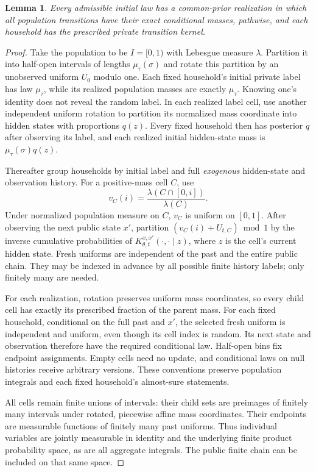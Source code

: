 \documentclass[11pt]{article}
\newtheorem{lemma}{Lemma}
\begin{document}
\begin{lemma}\label{population}
Every admissible initial law has a common-prior realization in which all population transitions have their exact conditional masses, pathwise, and each household has the prescribed private transition kernel.
\end{lemma}
\begin{proof}
Take the population to be $I=[0,1)$ with Lebesgue measure $\lambda$. Partition it into half-open intervals of lengths $\mu_\tau(\sigma)$ and rotate this partition by an unobserved uniform $U_0$ modulo one. Each fixed household's initial private label has law $\mu_\tau$, while its realized population masses are exactly $\mu_\tau$. Knowing one's identity does not reveal the random label. In each realized label cell, use another independent uniform rotation to partition its normalized mass coordinate into hidden states with proportions $q(z)$. Every fixed household then has posterior $q$ after observing its label, and each realized initial hidden-state mass is $\mu_\tau(\sigma)q(z)$.

Thereafter group households by initial label and full \emph{exogenous} hidden-state and observation history. For a positive-mass cell $C$, use
\[
 v_C(i)=\frac{\lambda(C\cap[0,i])}{\lambda(C)}.
\]
Under normalized population measure on $C$, $v_C$ is uniform on $[0,1]$. After observing the next public state $x'$, partition
$(v_C(i)+U_{t,C})\bmod1$ by the inverse cumulative probabilities of
$K_{\theta,t}^{x,x'}(\cdot,\cdot\mid z)$, where $z$ is the cell's current hidden state. Fresh uniforms are independent of the past and the entire public chain. They may be indexed in advance by all possible finite history labels; only finitely many are needed.

For each realization, rotation preserves uniform mass coordinates, so every child cell has exactly its prescribed fraction of the parent mass. For each fixed household, conditional on the full past and $x'$, the selected fresh uniform is independent and uniform, even though its cell index is random. Its next state and observation therefore have the required conditional law. Half-open bins fix endpoint assignments. Empty cells need no update, and conditional laws on null histories receive arbitrary versions. These conventions preserve population integrals and each fixed household's almost-sure statements.

All cells remain finite unions of intervals: their child sets are preimages of finitely many intervals under rotated, piecewise affine mass coordinates. Their endpoints are measurable functions of finitely many past uniforms. Thus individual variables are jointly measurable in identity and the underlying finite product probability space, as are all aggregate integrals. The public finite chain can be included on that same space.


\end{proof}
\end{document}
